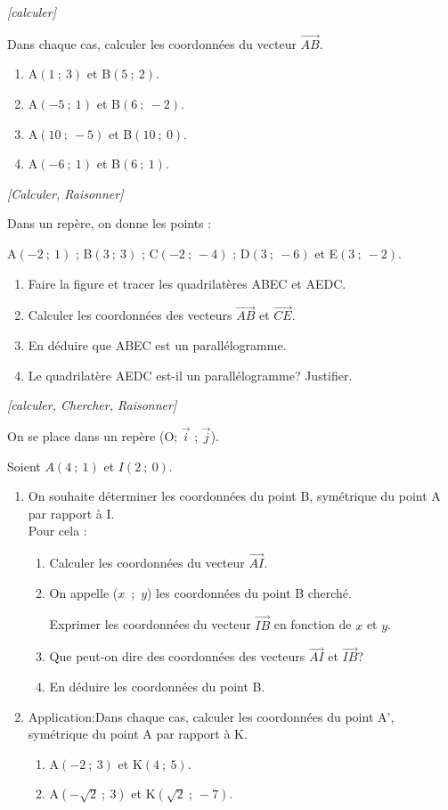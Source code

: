 \exo \textit{[calculer]}

Dans chaque cas, calculer les coordonnées du vecteur  $\overrightarrow{AB}$.

\begin{enumerate}
\item A$(1~;~3)$ et B$(5~;~2)$.
\item A$(-5~;~1)$ et B$(6~;~-2)$.
\item A$(10~;~-5)$ et B$(10~;~0)$.
\item A$(-6~;~1)$ et B$(6~;~1)$.
\end{enumerate}


\exo \textit{[Calculer, Raisonner]}

Dans un repère, on donne les points : 

A$(-2~;~1)$ ; B$(3~;~3)$ ; C$(-2~;~-4)$ ; D$(3~;~-6)$ et E$(3~;~-2)$.

\begin{enumerate}
\item Faire la figure et tracer les quadrilatères ABEC et AEDC.
\item Calculer les coordonnées des vecteurs  $\overrightarrow{AB}$ et  $\overrightarrow{CE}$.
\item En déduire que ABEC est un parallélogramme.
\item Le quadrilatère AEDC est-il un parallélogramme? Justifier.
\end{enumerate}

\medskip

\exo \textit{[calculer, Chercher, Raisonner]}

On se place dans un repère (O; $\vec{i}$ ; $\vec{j}$).

Soient $A(4~;~1)$ et $I(2~;~0)$.



\begin{enumerate}
\item On souhaite déterminer les coordonnées du point B, symétrique du point A par rapport à I.  \\Pour cela :
 \begin{enumerate}[label=\alph*)]
\item Calculer les coordonnées du vecteur $\overrightarrow{AI}$.
\item  On appelle ($x$~;~$y$) les coordonnées du point B cherché.

Exprimer les coordonnées du vecteur $\overrightarrow{IB}$ en fonction de $x$ et $y$.


\item Que peut-on dire des coordonnées des vecteurs $\overrightarrow{AI}$ et $\overrightarrow{IB}$? 
\item En déduire les coordonnées du point B. 
\end{enumerate}
\item Application:Dans chaque cas, calculer les coordonnées du point A', symétrique du point A par rapport à K.
\begin{enumerate} [label=\alph*)]
\item A$(-2~;~3)$ et K$(4~;~5)$.
\item A$(-\sqrt{2}~;~3)$ et K$(\sqrt{2}~;~-7)$.
\end{enumerate}
\end{enumerate}

